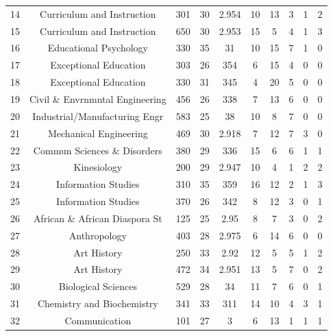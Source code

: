 \documentclass[12pt,letterpaper,oneside,openany]{book}
\begin{document}
\begin{center}
\begin{longtable}{c||ccccccccc}
		14 & Curriculum and Instruction      & 301   & 30                & 2.954 & 10 & 13 & 3 & 1 & 2 \\
		15 & Curriculum and Instruction      & 650   & 30                & 2.953 & 15 & 5  & 4 & 1 & 3 \\
		16 & Educational Psychology          & 330   & 35                & 31  & 10 & 15 & 7 & 1 & 0 \\
		17 & Exceptional Education           & 303   & 26                & 354 & 6  & 15 & 4 & 0 & 0 \\
		18 & Exceptional Education           & 330   & 31                & 345 & 4  & 20 & 5 & 0 & 0 \\
		19 & Civil \& Envrnmntal Engineering & 456   & 26                & 338 & 7  & 13 & 6 & 0 & 0 \\
		20 & Industrial/Manufacturing Engr   & 583   & 25                & 38  & 10 & 8  & 7 & 0 & 0 \\
		21 & Mechanical Engineering          & 469   & 30                & 2.918 & 7  & 12 & 7 & 3 & 0 \\
		22 & Commun Sciences \& Disorders    & 380   & 29                & 336 & 15 & 6  & 6 & 1 & 1 \\
		23 & Kinesiology                     & 200   & 29                & 2.947 & 10 & 4  & 1 & 2 & 2 \\
		24 & Information Studies             & 310   & 35                & 359 & 16 & 12 & 2 & 1 & 3 \\
		25 & Information Studies             & 370   & 26                & 342 & 8  & 12 & 3 & 0 & 1 \\
		26 & African \& African Diaspora St  & 125   & 25                & 2.95  & 8  & 7  & 3 & 0 & 2 \\
		27 & Anthropology                    & 403   & 28                & 2.975 & 6  & 14 & 6 & 0 & 0 \\
		28 & Art History                     & 250   & 33                & 2.92  & 12 & 5  & 5 & 1 & 2 \\
		29 & Art History                     & 472   & 34                & 2.951 & 13 & 5  & 7 & 0 & 2 \\
		30 & Biological Sciences             & 529   & 28                & 34  & 11 & 7  & 6 & 0 & 1 \\
		31 & Chemistry and Biochemistry      & 341   & 33                & 311 & 14 & 10 & 4 & 3 & 1 \\
		32 & Communication                   & 101   & 27                & 3   & 6  & 13 & 1 & 1 & 1 \\

\end{longtable}
\end{center}
\end{document}
